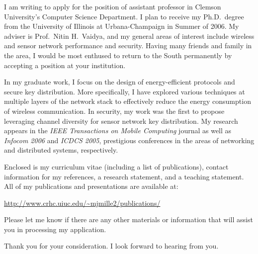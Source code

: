 \documentclass[10pt,stdletter,dateno]{newlfm}
\begin{document}
    \begin{newlfm}
        
        I am writing to apply for the position of assistant
        professor in Clemson University's Computer Science Department.  I plan to receive my
        Ph.D.\ degree from the University of Illinois at
        Urbana-Champaign in Summer of 2006.  My adviser is
        Prof.\ Nitin H.\ Vaidya, and my general areas of interest
        include wireless and sensor network performance and security.
        Having many friends and family in the area, I would be
        most enthused to return to the South permanently by accepting
        a position at your institution.
        
        In my graduate work, I focus on the design of
        energy-efficient protocols and secure key distribution.
        More specifically, I have explored various techniques at
        multiple layers of the network stack to effectively reduce
        the energy consumption of wireless communication.  In security,
        my work was the first to propose leveraging channel diversity
        for sensor network key distribution.  My research appears in 
        the \textit{IEEE Transactions on Mobile Computing} journal as
        well as \textit{Infocom 2006} and \textit{ICDCS 2005},
        prestigious conferences in the areas of networking and distributed
        systems, respectively.
        
        Enclosed is my curriculum vitae (including a list of
        publications), contact information for my references, a research
        statement, and a teaching statement.  All of my publications and
        presentations are available at:
        
        \url{http://www.crhc.uiuc.edu/~mjmille2/publications/}
        
        Please let me know if there are any other materials
        or information that will assist you in processing my application.
        
        Thank you for your consideration.  I look forward to
        hearing from you.
        
    \end{newlfm}
\end{document}
